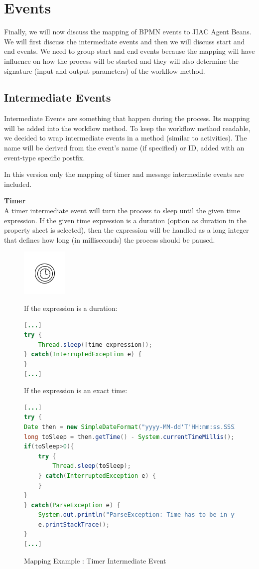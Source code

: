 \section{Events}
Finally, we will now discuss the mapping of BPMN events to JIAC Agent Beans. We will first discuss the intermediate events and then we will discuss start and end events. We need to group start and end events because the mapping will have influence on how the process will be started and they will also determine the signature (input and output parameters) of the workflow method. 

\subsection{Intermediate Events}
Intermediate Events are something that happen during the process. Its mapping will be added into the workflow method. To keep the workflow method readable, we decided to wrap intermediate events in a method (similar to activities). The name will be derived from the event's name (if specified) or ID, added with an event-type specific postfix.

In this version only the mapping of timer and message intermediate events are included. 

\textbf{Timer}\\
A timer intermediate event will turn the process to sleep until the given time expression. If the given time expression is a duration (option as duration in the property sheet is selected), then the expression will be handled as a long integer that defines how long (in milliseconds) the process should be paused.
\begin{figure}[h]
\begin{minipage}[c]{0.28\textwidth}
\includegraphics{images/mapping/timer_intermediate.png}
\end{minipage}
\begin{minipage}[c]{0.72\textwidth}
If the expression is a duration:
\begin{lstlisting}[language = Java]
[...]
try {
	Thread.sleep([time expression]);
} catch(InterruptedException e) {
}
[...]
\end{lstlisting}
If the expression is an exact time:
\begin{lstlisting}[language = Java]
[...]
try {
Date then = new SimpleDateFormat("yyyy-MM-dd'T'HH:mm:ss.SSSZ").parse([time expression]);
long toSleep = then.getTime() - System.currentTimeMillis();
if(toSleep>0){
	try {
		Thread.sleep(toSleep);
	} catch(InterruptedException e) {
	}
}
} catch(ParseException e) {
	System.out.println("ParseException: Time has to be in yyyy-MM-dd'T'HH:mm:ss.SSSZ form");
	e.printStackTrace();
}
[...]
\end{lstlisting}
\end{minipage}
\caption{Mapping Example : Timer Intermediate Event}%
\label{fig:timer_intermediate}%
\end{figure}

